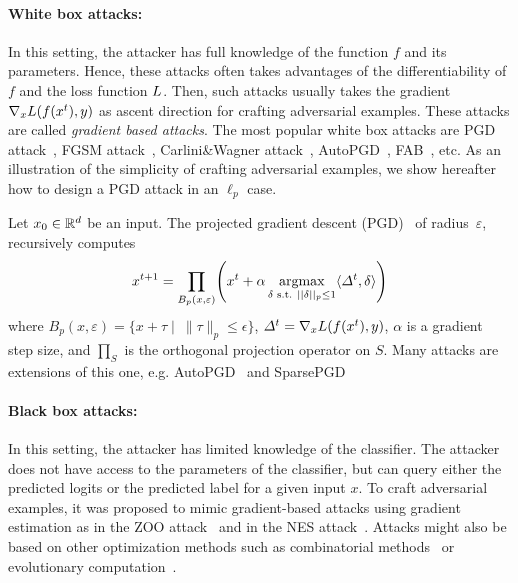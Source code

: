\paragraph{White box attacks:} In this setting, the attacker has  full knowledge of the function ${f}$ and its parameters. Hence, these attacks often takes advantages of the differentiability of ${f}$ and the loss function $L$. Then, such attacks usually takes the gradient $\nabla_x \loss\left(f\left(x^t\right),y\right)$ as ascent direction for crafting adversarial examples.  These attacks are called \emph{gradient based attacks}. The most popular white box attacks are PGD attack~\cite{kurakin2016adversarial,madry2018towards}, FGSM attack~\citep{goodfellow2014explaining}, Carlini\&Wagner attack~\citep{carlini2017towards}, AutoPGD~\citep{Croce2020MinimallyDA}, FAB~\citep{Croce2020MinimallyDA}, etc. As an illustration of the simplicity of crafting adversarial examples, we show hereafter how to design a PGD attack in an $\ell_p$ case.
\begin{example*} Let $x_0\in\mathbb{R}^d$ be an input. The projected gradient descent (PGD)~\cite{kurakin2016adversarial,madry2018towards} of radius~$\varepsilon$, recursively computes
\begin{align*}
x^{t+1}=\prod_{B_p(x,\varepsilon)}\left(x^t
+\alpha \argmaxB_{\delta\text{ s.t. }||\delta||_p\leq1} \langle\Delta^t,\delta \rangle\right)
\end{align*}
where $B_p(x,\varepsilon) = \{ x+\tau\mid~\lVert\tau\rVert_p \leq \epsilon\}$, $\Delta^t=\nabla_x \loss\left(f\left(x^t\right),y\right)$, $\alpha$ is a gradient step size, and $\prod_S$ is the orthogonal projection operator on $S$. Many attacks are extensions of this one, e.g. AutoPGD~\citep{croce2020reliable} and SparsePGD~\citep{tramer2019adversarial}
\end{example*}
\paragraph{Black box attacks:} In this setting, the attacker has limited knowledge of the classifier. The attacker does not have access to the parameters of the classifier, but can query either the predicted logits or the predicted label for a given input $x$. To craft adversarial examples, it was proposed to mimic gradient-based attacks using gradient estimation as in the ZOO attack~\citep{chen2017zoo} and in the NES attack~\citep{ilyas2018black,ilyas2019adversarial}. Attacks might also be based on other optimization methods such as combinatorial methods~\citep{moon19aparsimonous} or evolutionary computation~\citep{andriushchenko2019square}.










